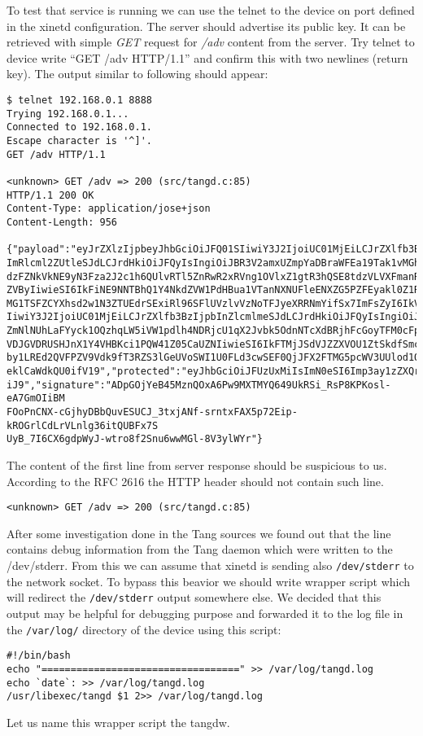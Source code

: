 To test that service is running we can use the telnet to the device on port defined in the xinetd configuration.
The server should advertise its public key.
It can be retrieved with simple {\it GET} request for {\it /adv} content from the server.
Try telnet to device write “GET /adv HTTP/1.1” and confirm this with two newlines (return key).
The output similar to following should appear:
\begin{lstlisting}[columns=fixed,basicstyle=\ttfamily\footnotesize,tabsize=4,backgroundcolor=\color{yellow!10}]
$ telnet 192.168.0.1 8888
Trying 192.168.0.1...
Connected to 192.168.0.1.
Escape character is '^]'.
GET /adv HTTP/1.1

<unknown> GET /adv => 200 (src/tangd.c:85)
HTTP/1.1 200 OK
Content-Type: application/jose+json
Content-Length: 956

{"payload":"eyJrZXlzIjpbeyJhbGciOiJFQ01SIiwiY3J2IjoiUC01MjEiLCJrZXlfb3BzIjpb
ImRlcml2ZUtleSJdLCJrdHkiOiJFQyIsIngiOiJBR3V2amxUZmpYaDBraWFEa19Tak1vMGhYUm1R
dzFZNkVkNE9yN3Fza2J2c1h6QUlvRTl5ZnRwR2xRVng1OVlxZ1gtR3hQSE8tdzVLVXFmanRGQkVV
ZVByIiwieSI6IkFiNE9NNTBhQ1Y4NkdZVW1PdHBua1VTanNXNUFleENXZG5PZFEyakl0Z1RGNXNq
MG1TSFZCYXhsd2w1N3ZTUEdrSExiRl96SFlUVzlvVzNoTFJyeXRRNmYifSx7ImFsZyI6IkVTNTEy
IiwiY3J2IjoiUC01MjEiLCJrZXlfb3BzIjpbInZlcmlmeSJdLCJrdHkiOiJFQyIsIngiOiJBQVpS
ZmNlNUhLaFYyck1OQzhqLW5iVW1pdlh4NDRjcU1qX2Jvbk5OdnNTcXdBRjhFcGoyTFM0cFpfdUNR
VDJGVDRUSHJnX1Y4VHBKci1PQW41Z05CaUZNIiwieSI6IkFTMjJSdVJZZXVOU1ZtSkdfSmcwSW1n
by1LREd2QVFPZV9Vdk9fT3RZS3lGeUVoSWI1U0FLd3cwSEF0QjJFX2FTMG5pcWV3UUlod1QyanR5
eklCaWdkQU0ifV19","protected":"eyJhbGciOiJFUzUxMiIsImN0eSI6Imp3ay1zZXQranNvb
iJ9","signature":"ADpGOjYeB45MznQOxA6Pw9MXTMYQ649UkRSi_RsP8KPKosl-eA7GmOIiBM
FOoPnCNX-cGjhyDBbQuvESUCJ_3txjANf-srntxFAX5p72Eip-kROGrlCdLrVLnlg36itQUBFx7S
UyB_7I6CX6gdpWyJ-wtro8f2Snu6wwMGl-8V3ylWYr"}
\end{lstlisting}
The content of the first line from server response should be suspicious to us.
According to the RFC 2616 the HTTP header should not contain such line\cite{RFC2616}.
\begin{lstlisting}[columns=fixed,basicstyle=\ttfamily\footnotesize,tabsize=4,backgroundcolor=\color{yellow!10}]
<unknown> GET /adv => 200 (src/tangd.c:85)
\end{lstlisting}
After some investigation done in the Tang sources we found out that the line contains debug information from the Tang daemon which were written to the /dev/stderr.
From this we can assume that xinetd is sending also {\tt /dev/stderr} to the network socket.
To bypass this beavior we should write wrapper script which will redirect the {\tt /dev/stderr} output somewhere else.
We decided that this output may be helpful for debugging purpose and forwarded it to the log file in the {\tt /var/log/} directory of the device using this script:
\begin{lstlisting}[columns=fixed,basicstyle=\ttfamily\footnotesize,tabsize=4,backgroundcolor=\color{yellow!10}]
#!/bin/bash
echo "==================================" >> /var/log/tangd.log
echo `date`: >> /var/log/tangd.log
/usr/libexec/tangd $1 2>> /var/log/tangd.log
\end{lstlisting}
Let us name this wrapper script the tangdw.

